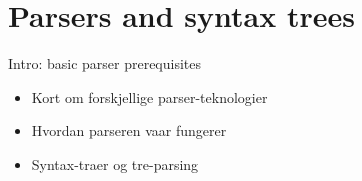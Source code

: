 \section{Parsers and syntax trees}
\label{sect:parser_and_syntaxtrees}
Intro: basic parser prerequisites

\begin{itemize}
  \item Kort om forskjellige parser-teknologier
  \item Hvordan parseren vaar fungerer
  \item Syntax-traer og tre-parsing
\end{itemize}
